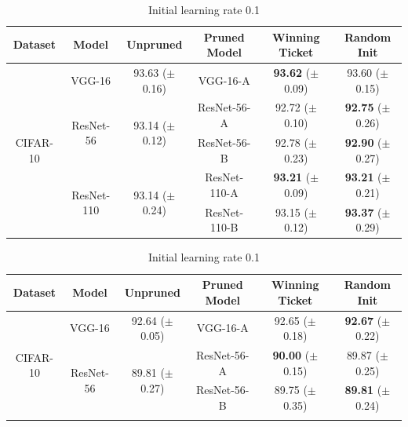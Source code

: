 \setlength{\tabcolsep}{4pt}
\renewcommand{\arraystretch}{1.15}
\begin{table}[!htbp]
\begin{subtable}[b]{\textwidth}
\centering
\small
\begin{tabular}{c|ccccc}
\hline
Dataset                   & Model                       & Unpruned                     & Pruned Model & Winning Ticket & Random Init \\ \hline
\multirow{5}{*}{CIFAR-10} & VGG-16                      & 93.63 ($\pm$0.16)                  & VGG-16-A     & \textbf{93.62} ($\pm$0.09)  & 93.60 ($\pm$0.15) \\ \cline{2-6} 
                          & \multirow{2}{*}{ResNet-56}  & \multirow{2}{*}{93.14 ($\pm$0.12)} & ResNet-56-A  & 92.72 ($\pm$0.10)  & \textbf{92.75} ($\pm$0.26) \\
                          &                             &                              & ResNet-56-B  & 92.78 ($\pm$0.23)  & \textbf{92.90} ($\pm$0.27) \\ \cline{2-6} 
                          & \multirow{2}{*}{ResNet-110} & \multirow{2}{*}{93.14 ($\pm$0.24)} & ResNet-110-A & \textbf{93.21} ($\pm$0.09)  & \textbf{93.21} ($\pm$0.21) \\
                          &                             &                              & ResNet-110-B & 93.15 ($\pm$0.12)  & \textbf{93.37} ($\pm$0.29) \\ \hline
\end{tabular}
\vspace{2ex}
\caption{Initial learning rate 0.1}
\end{subtable}
\begin{subtable}[b]{\textwidth}
\centering
\small
\begin{tabular}{c|ccccc}
\hline
Dataset                   & Model                       & Unpruned                     & Pruned Model & Winning Ticket & Random Init \\ \hline
\multirow{5}{*}{CIFAR-10} & VGG-16                      &        92.64 ($\pm$0.05)           & VGG-16-A     & 92.65 ($\pm$0.18)  & \textbf{92.67} ($\pm$0.22) \\ \cline{2-6} 
                          & \multirow{2}{*}{ResNet-56}  & \multirow{2}{*}{89.81  ($\pm$0.27)} & ResNet-56-A  & \textbf{90.00} ($\pm$0.15)  & 89.87 ($\pm$0.25) \\
                          &                             &                              & ResNet-56-B  & 89.75 ($\pm$0.35)  & \textbf{89.81} ($\pm$0.24) \\ \cline{2-6} 

\end{tabular}
\end{subtable}
\end{table}

